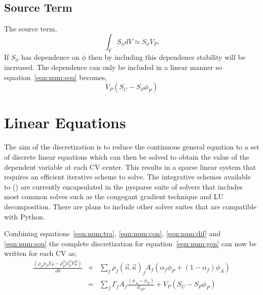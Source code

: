 \subsection{Source Term}

The source term, 
\begin{equation}
\int_V S_{\phi} dV \simeq S_\phi V_P.
\label{eqn:num:sou}
\end{equation}
If $S_\phi$ has dependence on $\phi$ then by including this dependence
stability will be increased. The dependence can only be included in
a linear manner so equation~\eqref{eqn:num:sou} becomes,
\begin{equation}
V_P (S_C - S_P \phi_P)
\end{equation}

\section{Linear Equations}

The aim of the discretization is to reduce the continuous general
equation to a set of discrete linear equations which can then be
solved to obtain the value of the dependent variable at each CV
center. This results in a sparse linear system that requires an
efficient iterative scheme to solve. The integrative schemes available
to \FiPy() are currently encapsulated in the pysparse suite of solvers
that includes most common solves such as the congegant gradient
technique and LU decomposition. There are plans to include other solver
suites that are compatible with Python.

Combining equations~\eqref{eqn:num:tra}, \eqref{eqn:num:con}, \eqref{eqn:num:dif} and
\eqref{eqn:num:sou} the complete discretization for equation~\eqref{eqn:num:gen}
can now be written for each CV as;
\begin{eqnarray}
\frac{(\rho_{P} \phi_{P} V_P- \rho_P^O \phi_P^O V_P^O)}{\Delta t}
&+&
\sum_{f} \rho_f (\vec{n}.\vec{u})_f A_f (\alpha_f \phi_P +(1-\alpha_f)\phi_A)
\\
&=&
\sum_f \Gamma_f A_f \frac{(\phi_A-\phi_P)}{d_{AP}}
+ 
V_P ( S_C - S_P \phi_P )
\label{eqn:num:dis}
\end{eqnarray}

